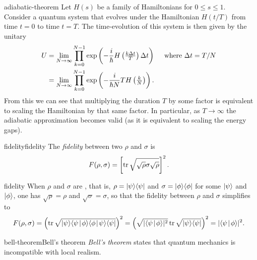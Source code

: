 \begin{example}{adiabatic-theorem}
    Let $H(s)$ be a family of Hamiltonians for $0 \le s \le 1$. Consider a quantum system that evolves under the Hamiltonian $H(t/T)$ from time $t = 0$ to time $t = T$. The time-evolution of this system is then given by the unitary
    \[ \begin{aligned}
        U &= \lim_{N \to \infty} \prod_{k = 0}^{N - 1} \exp \left( - \frac{i}{\hbar} H \left(\tfrac{k \Delta t}{T} \right) \Delta t \right) \quad \textup{ where } \Delta t = T / N \\
        &= \lim_{N \to \infty} \prod_{k = 0}^{N - 1} \exp \left( - \frac{i}{\hbar N} T H \left(\tfrac{k}{N} \right) \right) . 
    \end{aligned} \]
    From this we can see that multiplying the duration $T$ by some factor is equivalent to scaling the Hamiltonian by that same factor. In particular, as $T \to \infty$ the adiabatic approximation becomes valid (as it is equivalent to scaling the energy gaps). 
\end{example}

\begin{topic}{fidelity}{fidelity}
    The \emph{fidelity} between two  $\rho$ and $\sigma$ is
    \[ F(\rho, \sigma) = \left[ \operatorname{tr} \sqrt{\sqrt{\rho} \sigma \sqrt{\rho}} \right]^2 . \]
\end{topic}

\begin{example}{fidelity}
    When $\rho$ and $\sigma$ are , that is, $\rho = |\psi\rangle \langle\psi|$ and $\sigma = |\phi\rangle \langle\phi|$ for some $|\psi\rangle$ and $|\phi\rangle$, one has $\sqrt{\rho} = \rho$ and $\sqrt{\sigma} = \sigma$, so that the fidelity between $\rho$ and $\sigma$ simplifies to
    \[ F(\rho, \sigma) = \left( \tr \sqrt{\ket{\psi} \braket{\psi}{\phi} \braket{\phi}{\psi} \bra{\psi}} \right)^2 = \left( \sqrt{|\braket{\psi}{\phi}|^2} \tr \sqrt{\ket{\psi} \bra{\psi}} \right)^2 = |\braket{\psi}{\phi}|^2 . \]
\end{example}

\begin{topic}{bell-theorem}{Bell's theorem}
    \emph{Bell's theorem} states that quantum mechanics is incompatible with local realism.
\end{topic}

